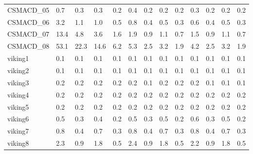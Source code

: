 \begin{table}
\begin{adjustbox}{max totalheight=\textheight}
\begin{tabular}{|l|llllllllllll|}
    CSMACD\_05         & 0.7      & 0.3      & 0.3      & 0.2      & 0.4   & 0.2  & 0.2   & 0.2  & 0.3               & 0.2               & 0.2               & 0.2               \\
    CSMACD\_06         & 3.2      & 1.1      & 1.0      & 0.5      & 0.8   & 0.4  & 0.5   & 0.3  & 0.6               & 0.4               & 0.5               & 0.3               \\
    CSMACD\_07         & 13.4     & 4.8      & 3.6      & 1.6      & 1.9   & 0.9  & 1.1   & 0.7  & 1.5               & 0.9               & 1.1               & 0.7               \\
    CSMACD\_08         & 53.1     & 22.3     & 14.6     & 6.2      & 5.3   & 2.5  & 3.2   & 1.9  & 4.2               & 2.5               & 3.2               & 1.9               \\ \hline
    viking1            & 0.1      & 0.1      & 0.1      & 0.1      & 0.1   & 0.1  & 0.1   & 0.1  & 0.1               & 0.1               & 0.1               & 0.1               \\
    viking2            & 0.1      & 0.1      & 0.1      & 0.1      & 0.1   & 0.1  & 0.1   & 0.1  & 0.1               & 0.1               & 0.1               & 0.1               \\
    viking3            & 0.2      & 0.2      & 0.2      & 0.2      & 0.2   & 0.1  & 0.2   & 0.2  & 0.2               & 0.1               & 0.1               & 0.1               \\
    viking4            & 0.2      & 0.2      & 0.2      & 0.2      & 0.2   & 0.2  & 0.2   & 0.2  & 0.2               & 0.2               & 0.2               & 0.2               \\
    viking5            & 0.2      & 0.2      & 0.2      & 0.2      & 0.2   & 0.2  & 0.2   & 0.2  & 0.2               & 0.2               & 0.2               & 0.2               \\
    viking6            & 0.5      & 0.3      & 0.4      & 0.2      & 0.5   & 0.3  & 0.5   & 0.2  & 0.6               & 0.3               & 0.5               & 0.2               \\
    viking7            & 0.8      & 0.4      & 0.7      & 0.3      & 0.8   & 0.4  & 0.7   & 0.3  & 0.8               & 0.4               & 0.7               & 0.3               \\
    viking8            & 2.3      & 0.9      & 1.8      & 0.5      & 2.4   & 0.9  & 1.8   & 0.5  & 2.2               & 0.9               & 1.8               & 0.5               \\

\end{tabular}
\end{adjustbox}
\end{table}
